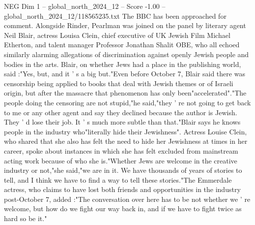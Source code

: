 \begin{textsample}{NEG Dim 1 – global\_north\_2024\_12 – Score -1.00 – global\_north\_2024\_12/118565235.txt}
The BBC has been approached for comment.
Alongside Rinder, Pearlman was joined on the panel by literary agent Neil Blair, actress Louisa Clein, chief executive of UK Jewish Film Michael Etherton, and talent manager Professor Jonathan Shalit OBE, who all echoed similarly alarming allegations of discrimination against openly Jewish people and bodies in the arts.
Blair, on whether Jews had a place in the publishing world, said :"Yes, but, and it ' s a big but."Even before October 7, Blair said there was censorship being applied to books that deal with Jewish themes or of Israeli origin, but after the massacre that phenomenon has only been"accelerated"."The people doing the censoring are not stupid,"he said,"they ' re not going to get back to me or any other agent and say they declined because the author is Jewish.
They ' d lose their job.
It ' s much more subtle than that."Blair says he knows people in the industry who"literally hide their Jewishness".
Actress Louise Clein, who shared that she also has felt the need to hide her Jewishness at times in her career, spoke about instances in which she has felt excluded from mainstream acting work because of who she is."Whether Jews are welcome in the creative industry or not,"she said,"we are in it.
We have thousands of years of stories to tell, and I think we have to find a way to tell these stories."The Emmerdale actress, who claims to have lost both friends and opportunities in the industry post-October 7, added :"The conversation over here has to be not whether we ' re welcome, but how do we fight our way back in, and if we have to fight twice as hard so be it."

\end{textsample}
